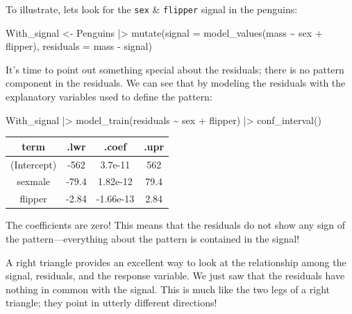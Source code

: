 \documentclass[
  letterpaper,
  DIV=11,
  numbers=noendperiod,
  oneside]{scrartcl}
\newenvironment{Shaded}{\begin{snugshade}}{\end{snugshade}}
\newcommand{\AttributeTok}[1]{\textcolor[rgb]{0.40,0.45,0.13}{#1}}
\newcommand{\FunctionTok}[1]{\textcolor[rgb]{0.28,0.35,0.67}{#1}}
\newcommand{\NormalTok}[1]{\textcolor[rgb]{0.00,0.23,0.31}{#1}}
\newcommand{\OtherTok}[1]{\textcolor[rgb]{0.00,0.23,0.31}{#1}}
\newcommand{\SpecialCharTok}[1]{\textcolor[rgb]{0.37,0.37,0.37}{#1}}
\begin{document}
To illustrate, lets look for the \texttt{sex} \& \texttt{flipper} signal
in the penguins:

\begin{Shaded}
\begin{Highlighting}[]
\NormalTok{With\_signal }\OtherTok{\textless{}{-}}
\NormalTok{  Penguins }\SpecialCharTok{|\textgreater{}} 
  \FunctionTok{mutate}\NormalTok{(}\AttributeTok{signal =} \FunctionTok{model\_values}\NormalTok{(mass }\SpecialCharTok{\textasciitilde{}}\NormalTok{ sex }\SpecialCharTok{+}\NormalTok{ flipper),}
         \AttributeTok{residuals =}\NormalTok{ mass }\SpecialCharTok{{-}}\NormalTok{ signal)}
\end{Highlighting}
\end{Shaded}

It's time to point out something special about the residuals; there is
no pattern component in the residuals. We can see that by modeling the
residuals with the explanatory variables used to define the pattern:

\begin{Shaded}
\begin{Highlighting}[]
\NormalTok{With\_signal }\SpecialCharTok{|\textgreater{}}
  \FunctionTok{model\_train}\NormalTok{(residuals }\SpecialCharTok{\textasciitilde{}}\NormalTok{ sex }\SpecialCharTok{+}\NormalTok{ flipper) }\SpecialCharTok{|\textgreater{}}
  \FunctionTok{conf\_interval}\NormalTok{()}
\end{Highlighting}
\end{Shaded}

\begin{longtable}[]{@{}cccc@{}}
\toprule\noalign{}
term & .lwr & .coef & .upr \\
\midrule\noalign{}
\endhead
\bottomrule\noalign{}
\endlastfoot
(Intercept) & -562 & 3.7e-11 & 562 \\
sexmale & -79.4 & 1.82e-12 & 79.4 \\
flipper & -2.84 & -1.66e-13 & 2.84 \\
\end{longtable}

The coefficients are zero! This means that the residuals do not show any
sign of the pattern---everything about the pattern is contained in the
signal!

A right triangle provides an excellent way to look at the relationship
among the signal, residuals, and the response variable. We just saw that
the residuals have nothing in common with the signal. This is much like
the two legs of a right triangle; they point in utterly different
directions!
\end{document}
